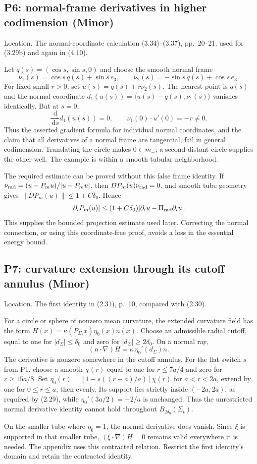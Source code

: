 \documentclass[10pt]{article}
\begin{document}
\subsection*{P6: normal-frame derivatives in higher codimension (Minor)}
Location. The normal-coordinate calculation (3.34)–(3.37), pp. 20–21, used for (3.29b) and again in (4.10).\par
Let \(q(s)=(\cos s,\sin s,0)\) and choose the smooth normal frame \[\nu_1(s)=\cos s\,q(s)+\sin s\,e_3,\qquad
 \nu_2(s)=-\sin s\,q(s)+\cos s\,e_3.\] For fixed small \(r>0\), set \(u(s)=q(s)+r\nu_2(s)\). The nearest point is \(q(s)\) and the normal coordinate \(d_1(u(s))=\langle u(s)-q(s),\nu_1(s)\rangle\) vanishes identically. But at \(s=0\), \[\frac{\,\mathrm d}{\,\mathrm ds}d_1(u(s))=0,\qquad
 \nu_1(0)\cdot u'(0)=-r\neq0.\] Thus the asserted gradient formula for individual normal coordinates, and the claim that all derivatives of a normal frame are tangential, fail in general codimension. Translating the circle makes \(0\in m_-\); a second distant circle supplies the other well. The example is within a smooth tubular neighborhood.\par
The required estimate can be proved without this false frame identity. If \(\nu_{\rm rad}=(u-P_mu)/|u-P_mu|\), then \(DP_m(u)\nu_{\rm rad}=0\), and smooth tube geometry gives \(\|DP_m(u)\|\leq1+C\delta_0\). Hence \[|\partial_iP_m(u)|
 \leq(1+C\delta_0)
     |\partial_i u-\Pi_{\rm rad}\partial_i u|.\] This supplies the bounded projection estimate used later. Correcting the normal connection, or using this coordinate-free proof, avoids a loss in the essential energy bound.\par
\subsection*{P7: curvature extension through its cutoff annulus (Minor)}
Location. The first identity in (2.31), p. 10, compared with (2.30).\par
For a circle or sphere of nonzero mean curvature, the extended curvature field has the form \(H(x)=\kappa(P_{\Sigma_t}x)\eta_0(x)n(x)\). Choose an admissible radial cutoff, equal to one for \(|d_\Sigma|\leq\delta_0\) and zero for \(|d_\Sigma|\geq2\delta_0\). On a normal ray, \[(n\cdot\nabla)H=\kappa\,\eta_0'(d_\Sigma)n.\] The derivative is nonzero somewhere in the cutoff annulus. For the flat switch \(s\) from P1, choose a smooth \(\chi(r)\) equal to one for \(r\leq7a/4\) and zero for \(r\geq15a/8\). Set \(\eta_0(r)=[1-s((r-a)/a)]\chi(r)\) for \(a<r<2a\), extend by one for \(0\leq r\leq a\), then evenly. Its support lies strictly inside \((-2a,2a)\), as required by (2.29), while \(\eta_0'(3a/2)=-2/a\) is unchanged. Thus the unrestricted normal derivative identity cannot hold throughout \(B_{2\delta_0}(\Sigma_t)\).\par
On the smaller tube where \(\eta_0=1\), the normal derivative does vanish. Since \(\xi\) is supported in that smaller tube, \((\xi\cdot\nabla)H=0\) remains valid everywhere it is needed. The appendix uses this contracted relation. Restrict the first identity’s domain and retain the contracted identity.\par
\end{document}
